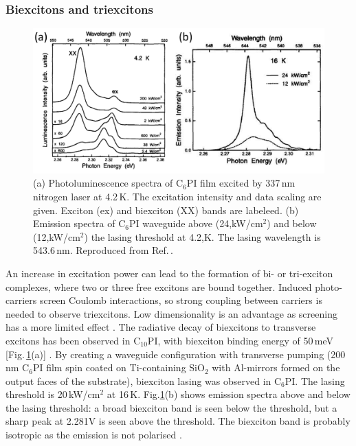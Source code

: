 \subsubsection{Biexcitons and triexcitons}
\begin{figure}[h!]
\centering
\includegraphics[width=\textwidth]{Fig15}
\caption{(a) Photoluminescence spectra of $\textrm{C}_{6}$PI film excited by 337\,nm nitrogen laser at 4.2\,K. The excitation intensity and data scaling are given. Exciton (ex) and biexciton (XX) bands are labeleed. (b) Emission spectra of $\textrm{C}_{6}$PI waveguide above (24,kW/$\textrm{cm}^2$) and below (12,kW/$\textrm{cm}^2$) the lasing threshold at 4.2,K. The lasing wavelength is 543.6\,nm. Reproduced from Ref.\,\cite{Kondo1998}.}
\label{2Fig15}
\end{figure}
An increase in excitation power can lead to the formation of bi- or tri-exciton complexes, where two or three free excitons are bound together. Induced photo-carriers screen Coulomb interactions, so strong coupling between carriers is needed to observe triexcitons. Low dimensionality is an advantage as screening has a more limited effect \cite{Shimizu2006a}. The radiative decay of biexcitons to transverse excitons has been observed in $\textrm{C}_{10}$PI, with biexciton binding energy of 50\,meV [Fig.\,\ref{2Fig15}(a)] \cite{Ishihara1992}. By creating a waveguide configuration with transverse pumping (200\,nm $\textrm{C}_{6}$PI film spin coated on Ti-containing Si$\textrm{O}_2$ with Al-mirrors formed on the output faces of the substrate), biexciton lasing was observed in $\textrm{C}_6$PI. The lasing threshold is 20\,kW/$\textrm{cm}^2$ at 16\,K. Fig.\ref{2Fig15}(b) shows emission spectra above and below the lasing threshold: a broad biexciton band is seen below the threshold, but a sharp peak at 2.281V is seen above the threshold. The biexciton band is probably isotropic as the emission is not polarised \cite{Kondo1998}.

